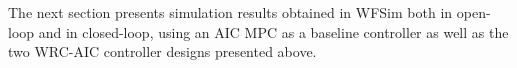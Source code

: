 

The next section presents simulation results obtained in WFSim both in open-loop and in closed-loop, using an AIC MPC as a baseline controller as well as the two WRC-AIC controller designs presented above.

